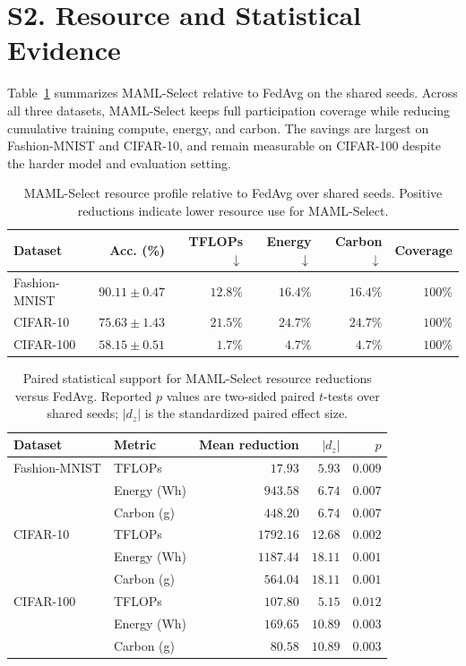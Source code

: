 \documentclass[10pt]{article}
\begin{document}
\section*{S2. Resource and Statistical Evidence}

Table~\ref{tab:supp_reductions} summarizes MAML-Select relative to FedAvg on the shared seeds.  Across all three datasets, MAML-Select keeps full participation coverage while reducing cumulative training compute, energy, and carbon.  The savings are largest on Fashion-MNIST and CIFAR-10, and remain measurable on CIFAR-100 despite the harder model and evaluation setting.

\begin{table}[!ht]
\centering
\caption{MAML-Select resource profile relative to FedAvg over shared seeds.  Positive reductions indicate lower resource use for MAML-Select.}
\label{tab:supp_reductions}
\small
\begin{tabular}{@{}lrrrrr@{}}
\toprule
Dataset & Acc. (\%) & TFLOPs $\downarrow$ & Energy $\downarrow$ & Carbon $\downarrow$ & Coverage \\
\midrule
Fashion-MNIST & $90.11 \pm 0.47$ & $12.8\%$ & $16.4\%$ & $16.4\%$ & $100\%$ \\
CIFAR-10 & $75.63 \pm 1.43$ & $21.5\%$ & $24.7\%$ & $24.7\%$ & $100\%$ \\
CIFAR-100 & $58.15 \pm 0.51$ & $1.7\%$ & $4.7\%$ & $4.7\%$ & $100\%$ \\
\bottomrule
\end{tabular}
\end{table}

\begin{table}[!ht]
\centering
\caption{Paired statistical support for MAML-Select resource reductions versus FedAvg.  Reported $p$ values are two-sided paired $t$-tests over shared seeds; $|d_z|$ is the standardized paired effect size.}
\label{tab:supp_stats}
\small
\begin{tabular}{@{}llrrr@{}}
\toprule
Dataset & Metric & Mean reduction & $|d_z|$ & $p$ \\
\midrule
Fashion-MNIST & TFLOPs & $17.93$ & $5.93$ & $0.009$ \\
 & Energy (Wh) & $943.58$ & $6.74$ & $0.007$ \\
 & Carbon (g) & $448.20$ & $6.74$ & $0.007$ \\
\midrule
CIFAR-10 & TFLOPs & $1792.16$ & $12.68$ & $0.002$ \\
 & Energy (Wh) & $1187.44$ & $18.11$ & $0.001$ \\
 & Carbon (g) & $564.04$ & $18.11$ & $0.001$ \\
\midrule
CIFAR-100 & TFLOPs & $107.80$ & $5.15$ & $0.012$ \\
 & Energy (Wh) & $169.65$ & $10.89$ & $0.003$ \\
 & Carbon (g) & $80.58$ & $10.89$ & $0.003$ \\
\bottomrule
\end{tabular}
\end{table}
\end{document}
